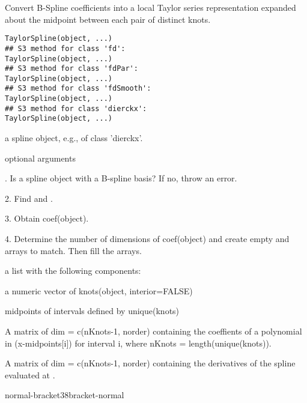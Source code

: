 \begin{Description}\relax
Convert B-Spline coefficients into a local Taylor series
representation expanded about the midpoint between each pair of
distinct knots.
\end{Description}
\begin{Usage}
\begin{verbatim}
TaylorSpline(object, ...)
## S3 method for class 'fd':
TaylorSpline(object, ...)
## S3 method for class 'fdPar':
TaylorSpline(object, ...)
## S3 method for class 'fdSmooth':
TaylorSpline(object, ...)
## S3 method for class 'dierckx':
TaylorSpline(object, ...)
\end{verbatim}
\end{Usage}
\begin{Arguments}
\begin{ldescription}
\item[\code{ object }] a spline object, e.g., of class 'dierckx'.

\item[\code{...}] optional arguments 
\end{ldescription}
\end{Arguments}
\begin{Details}.  Is  a spline object with a B-spline basis?  If no,
throw an error.

2.  Find  and .

3.  Obtain coef(object).

4.  Determine the number of dimensions of coef(object) and create
empty  and  arrays to match.  Then fill the
arrays.
\end{Details}
\begin{Value}
a list with the following components:

\begin{ldescription}
\item[\code{knots}] a numeric vector of knots(object, interior=FALSE)

\item[\code{midpoints}] midpoints of intervals defined by unique(knots)

\item[\code{coef}] A matrix of dim = c(nKnots-1, norder) containing the coeffients of
a polynomial in (x-midpoints[i]) for interval i, where nKnots =
length(unique(knots)).

\item[\code{deriv}] A matrix of dim = c(nKnots-1, norder) containing the derivatives
of the spline evaluated at .

\end{ldescription}

normal-bracket38bracket-normal
\end{Value}
